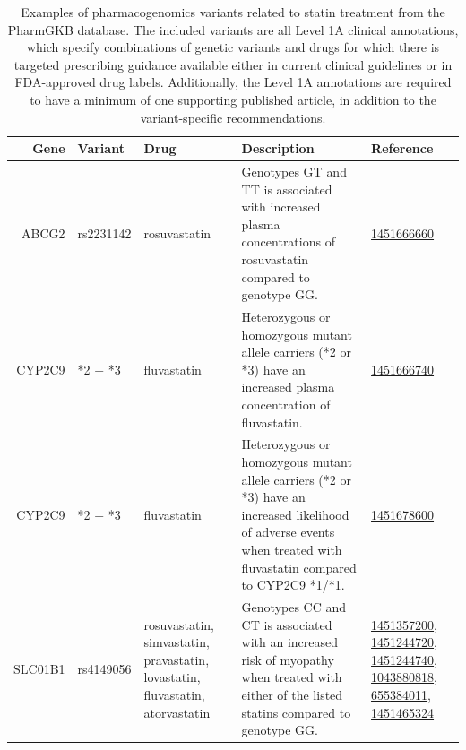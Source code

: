 \begin{table}[t]
\footnotesize
\centering
\tlfstyle
\begin{tabularx}{\linewidth}{r l p{3cm} X p{3.1cm}} 
\toprule
Gene & Variant & Drug & Description & Reference \\ 
\midrule

ABCG2 
& rs2231142
& rosuvastatin 
& Genotypes GT and TT is associated with increased plasma concentrations of 
rosuvastatin compared to genotype GG. 
&  \href{https://www.pharmgkb.org/clinicalAnnotation/1451666660}{1451666660}
\\

CYP2C9 
& *2 + *3 
& fluvastatin 
& Heterozygous or homozygous mutant allele carriers (*2 or *3) 
have an increased plasma concentration of fluvastatin.
& \href{https://www.pharmgkb.org/clinicalAnnotation/1451666740}{1451666740}
\\

CYP2C9 
& *2 + *3 
& fluvastatin 
& Heterozygous or homozygous mutant allele carriers (*2 or *3) 
have an increased likelihood of adverse events
when treated with fluvastatin compared to CYP2C9 *1/*1. 
&  \href{https://www.pharmgkb.org/clinicalAnnotation/1451678600}{1451678600}
\\

SLC01B1 
& rs4149056 
& rosuvastatin, simvastatin, pravastatin, lovastatin, fluvastatin, atorvastatin
& Genotypes CC and CT is associated with an increased risk of myopathy
when treated with either of the listed statins compared to genotype GG.
& \href{https://www.pharmgkb.org/clinicalAnnotation/1451357200}{1451357200},
\href{https://www.pharmgkb.org/clinicalAnnotation/1451244720}{1451244720},
\href{https://www.pharmgkb.org/clinicalAnnotation/1451244740}{1451244740},
\href{https://www.pharmgkb.org/clinicalAnnotation/1043880818}{1043880818},
\href{https://www.pharmgkb.org/clinicalAnnotation/655384011}{655384011},
\href{https://www.pharmgkb.org/clinicalAnnotation/1451465324}{1451465324}
\\

\bottomrule
\end{tabularx}
\caption[Pharmacogenomics of statins]{
	Examples of pharmacogenomics variants related to statin treatment 
	from the PharmGKB database.
	The included variants are all Level 1A clinical annotations, 
	which specify combinations of genetic variants and drugs for which there 
	is targeted prescribing guidance available either in
	current clinical guidelines or in FDA-approved drug labels. 
	Additionally, the Level 1A annotations are required to have a
	minimum of one supporting published article, in addition to the
	variant-specific recommendations.
 }
\label{tab:pgxvars}
\end{table}%

